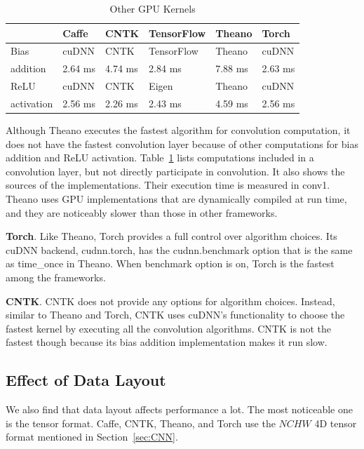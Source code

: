 \begin{table}[htbp]
\centering
\caption{Other GPU Kernels}
\label{table_misc_kernel}
\begin{scriptsize}
\begin{tabular}{|l|l|l|l|l|l|}
\hline\hline
           & Caffe    & CNTK    & TensorFlow & Theano  & Torch \\ \hline\hline
Bias       & cuDNN    & CNTK    & TensorFlow & Theano  & cuDNN \\ \cline{2-6} 
addition   & 2.64 ms  & 4.74 ms & 2.84 ms    & 7.88 ms & 2.63 ms  \\ \hline\hline
ReLU       & cuDNN    & CNTK    & Eigen      & Theano  & cuDNN \\ \cline{2-6}
activation & 2.56 ms  & 2.26 ms & 2.43 ms    & 4.59 ms & 2.56 ms  \\ \hline
\end{tabular}
\end{scriptsize}
\end{table}

Although Theano executes the fastest algorithm for convolution computation, it does not have the fastest convolution layer because of other computations for bias addition and ReLU activation. Table~\ref{table_misc_kernel} lists computations included in a convolution layer, but not directly participate in convolution. It also shows the sources of the implementations. Their execution time is measured in \textsf{conv1}. Theano uses GPU implementations that are dynamically compiled at run time, and they are noticeably slower than those in other frameworks.

{\bf Torch}. Like Theano, Torch provides a full control over algorithm choices. Its cuDNN backend, cudnn.torch, has the \textsf{cudnn.benchmark} option that is the same as \textsf{time\_once} in Theano. When \textsf{benchmark} option is on, Torch is the fastest among the frameworks. 

{\bf CNTK}. CNTK does not provide any options for algorithm choices. Instead, similar to Theano and Torch, CNTK uses cuDNN's functionality to choose the fastest kernel by executing all the convolution algorithms. CNTK is not the fastest though because its bias addition implementation makes it run slow.

\subsection{Effect of Data Layout}
We also find that data layout affects performance a lot. The most noticeable one is the tensor format.
Caffe, CNTK, Theano, and Torch use the $NCHW$ 4D tensor format mentioned in Section~\ref{sec:CNN}. 

